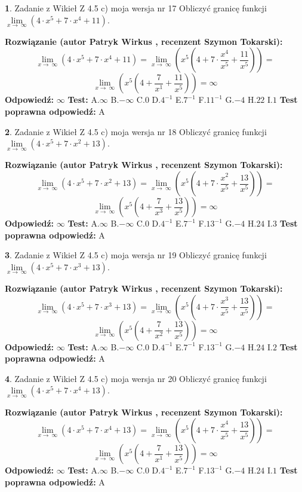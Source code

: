 \documentclass[12pt, a4paper]{article}
\theoremstyle{definition} %
\newtheorem{zad}{}
\newcommand{\zadStart}[1]{\begin{zad}#1\newline}
\newcommand{\zadStop}{\end{zad}}
\newcommand{\rozwStart}[2]{\noindent \textbf{Rozwiązanie (autor #1 , recenzent #2): }\newline}
\newcommand{\rozwStop}{\newline}
\newcommand{\odpStart}{\noindent \textbf{Odpowiedź:}\newline}
\newcommand{\odpStop}{\newline}
\newcommand{\testStart}{\noindent \textbf{Test:}\newline}
\newcommand{\testStop}{\newline}
\newcommand{\kluczStart}{\noindent \textbf{Test poprawna odpowiedź:}\newline}
\newcommand{\kluczStop}{\newline}
\begin{document}
\zadStart{Zadanie z Wikieł Z 4.5 c) moja wersja nr 17}
Obliczyć granicę funkcji  $\lim\limits_{x\to\ \infty}(4 \cdot x^{5}+7 \cdot x^{4}+11)$.
\zadStop
\rozwStart{Patryk Wirkus}{Szymon Tokarski}
$$\lim\limits_{x\to\ \infty}(4 \cdot x^{5}+7 \cdot x^{4}+11) = \lim\limits_{x\to\ \infty}(x^{5}(4 +7 \cdot \frac{x^{4}}{x^{5}}+\frac{11}{x^{5}})) =$$ $$\lim\limits_{x\to\ \infty}(x^{5}(4 +\frac{7}{x^{1}}+\frac{11}{x^{5}})) =\infty$$
\rozwStop
\odpStart
$\infty$
\odpStop
\testStart
A.$\infty$ B.$-\infty$ C.$0$ D.$4^{-1}$ E.$7^{-1}$
F.$11^{-1}$ G.$-4$
H.$22$
I.$1$
\testStop
\kluczStart
A
\kluczStop



\zadStart{Zadanie z Wikieł Z 4.5 c) moja wersja nr 18}
Obliczyć granicę funkcji  $\lim\limits_{x\to\ \infty}(4 \cdot x^{5}+7 \cdot x^{2}+13)$.
\zadStop
\rozwStart{Patryk Wirkus}{Szymon Tokarski}
$$\lim\limits_{x\to\ \infty}(4 \cdot x^{5}+7 \cdot x^{2}+13) = \lim\limits_{x\to\ \infty}(x^{5}(4 +7 \cdot \frac{x^{2}}{x^{5}}+\frac{13}{x^{5}})) =$$ $$\lim\limits_{x\to\ \infty}(x^{5}(4 +\frac{7}{x^{3}}+\frac{13}{x^{5}})) =\infty$$
\rozwStop
\odpStart
$\infty$
\odpStop
\testStart
A.$\infty$ B.$-\infty$ C.$0$ D.$4^{-1}$ E.$7^{-1}$
F.$13^{-1}$ G.$-4$
H.$24$
I.$3$
\testStop
\kluczStart
A
\kluczStop



\zadStart{Zadanie z Wikieł Z 4.5 c) moja wersja nr 19}
Obliczyć granicę funkcji  $\lim\limits_{x\to\ \infty}(4 \cdot x^{5}+7 \cdot x^{3}+13)$.
\zadStop
\rozwStart{Patryk Wirkus}{Szymon Tokarski}
$$\lim\limits_{x\to\ \infty}(4 \cdot x^{5}+7 \cdot x^{3}+13) = \lim\limits_{x\to\ \infty}(x^{5}(4 +7 \cdot \frac{x^{3}}{x^{5}}+\frac{13}{x^{5}})) =$$ $$\lim\limits_{x\to\ \infty}(x^{5}(4 +\frac{7}{x^{2}}+\frac{13}{x^{5}})) =\infty$$
\rozwStop
\odpStart
$\infty$
\odpStop
\testStart
A.$\infty$ B.$-\infty$ C.$0$ D.$4^{-1}$ E.$7^{-1}$
F.$13^{-1}$ G.$-4$
H.$24$
I.$2$
\testStop
\kluczStart
A
\kluczStop



\zadStart{Zadanie z Wikieł Z 4.5 c) moja wersja nr 20}
Obliczyć granicę funkcji  $\lim\limits_{x\to\ \infty}(4 \cdot x^{5}+7 \cdot x^{4}+13)$.
\zadStop
\rozwStart{Patryk Wirkus}{Szymon Tokarski}
$$\lim\limits_{x\to\ \infty}(4 \cdot x^{5}+7 \cdot x^{4}+13) = \lim\limits_{x\to\ \infty}(x^{5}(4 +7 \cdot \frac{x^{4}}{x^{5}}+\frac{13}{x^{5}})) =$$ $$\lim\limits_{x\to\ \infty}(x^{5}(4 +\frac{7}{x^{1}}+\frac{13}{x^{5}})) =\infty$$
\rozwStop
\odpStart
$\infty$
\odpStop
\testStart
A.$\infty$ B.$-\infty$ C.$0$ D.$4^{-1}$ E.$7^{-1}$
F.$13^{-1}$ G.$-4$
H.$24$
I.$1$
\testStop
\kluczStart
A
\kluczStop
\end{document}

